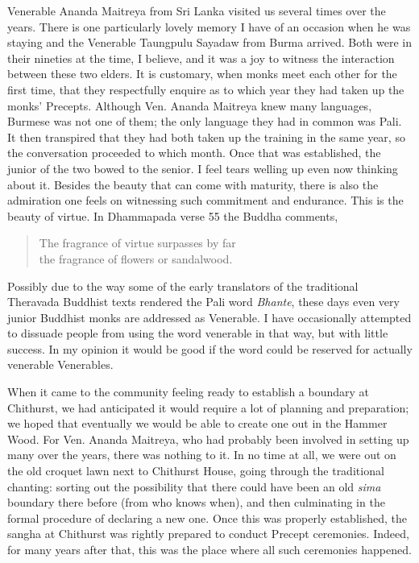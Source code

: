 Venerable Ananda Maitreya\cite{ananda}
from Sri Lanka visited us several times over
the years. There is one particularly lovely memory I have of an occasion
when he was staying and the Venerable Taungpulu Sayadaw\cite{taungpulu}
from Burma arrived. Both were in their
nineties at the time, I believe, and it was a joy to witness the
interaction between these two elders. It is customary, when monks meet
each other for the first time, that they respectfully enquire as to
which year they had taken up the monks' Precepts. Although Ven. Ananda
Maitreya knew many languages, Burmese was not one of them; the only
language they had in common was Pali. It then transpired that they had
both taken up the training in the same year, so the conversation
proceeded to which month. Once that was established, the junior of the
two bowed to the senior. I feel tears welling up even now thinking about
it. Besides the beauty that can come with maturity, there is also the
admiration one feels on witnessing such commitment and endurance. This
is the beauty of virtue. In Dhammapada verse 55 the Buddha comments,

\begin{quote}
  The fragrance of virtue surpasses by far\\
  the fragrance of flowers or sandalwood.
\end{quote}

Possibly due to the way some of the early translators of the traditional
Theravada Buddhist texts rendered the Pali word \emph{Bhante}, these days
even very junior Buddhist monks are addressed as Venerable.
I have occasionally attempted to dissuade people from using the word
venerable in that way, but with little success. In my opinion it would
be good if the word could be reserved for actually venerable
Venerables.

When it came to the community feeling ready to establish a boundary\cite{sima}
at Chithurst, we had anticipated it would
require a lot of planning and preparation; we hoped that eventually we
would be able to create one out in the Hammer Wood. For Ven. Ananda
Maitreya, who had probably been involved in setting up many over the
years, there was nothing to it. In no time at all, we were out on the
old croquet lawn next to Chithurst House, going through the traditional
chanting: sorting out the possibility that there could have been an old
\emph{sima} boundary there before (from who knows when), and then
culminating in the formal procedure of declaring a new one. Once this
was properly established, the sangha at Chithurst was rightly prepared
to conduct Precept ceremonies. Indeed, for many years after that, this
was the place where all such ceremonies happened.

